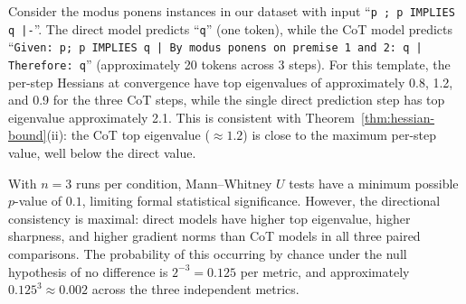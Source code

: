 \begin{example}\label{ex:modus-ponens}
  Consider the modus ponens instances in our dataset with input ``\texttt{p ;
  p IMPLIES q |-}''. The direct model predicts ``\texttt{q}'' (one token),
  while the CoT model predicts ``\texttt{Given: p; p IMPLIES q | By modus
  ponens on premise 1 and 2: q | Therefore: q}'' (approximately 20 tokens
  across 3 steps). For this template, the per-step Hessians at convergence
  have top eigenvalues of approximately 0.8, 1.2, and 0.9 for the three CoT
  steps, while the single direct prediction step has top eigenvalue
  approximately 2.1. This is consistent with
  Theorem~\ref{thm:hessian-bound}(ii): the CoT top eigenvalue ($\approx 1.2$)
  is close to the maximum per-step value, well below the direct value.
\end{example}

\begin{remark}\label{rem:statistical}
  With $n = 3$ runs per condition, Mann--Whitney $U$ tests have a minimum
  possible $p$-value of $0.1$, limiting formal statistical significance.
  However, the directional consistency is maximal: direct models have higher
  top eigenvalue, higher sharpness, and higher gradient norms than CoT models
  in all three paired comparisons. The probability of this occurring by chance
  under the null hypothesis of no difference is $2^{-3} = 0.125$ per metric,
  and approximately $0.125^3 \approx 0.002$ across the three independent
  metrics.
\end{remark}
